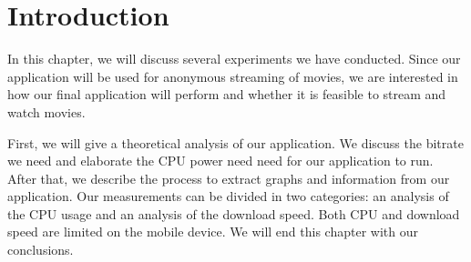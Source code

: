\section{Introduction}
	In this chapter, we will discuss several experiments we have conducted. Since our application will be used for anonymous streaming of movies, we are interested in how our final application will perform and whether it is feasible to stream and watch movies.
	
	First, we will give a theoretical analysis of our application. We discuss the bitrate we need and elaborate the CPU power need need for our application to run. After that, we describe the process to extract graphs and information from our application. Our measurements can be divided in two categories: an analysis of the CPU usage and an analysis of the download speed. Both CPU and download speed are limited on the mobile device. We will end this chapter with our conclusions.